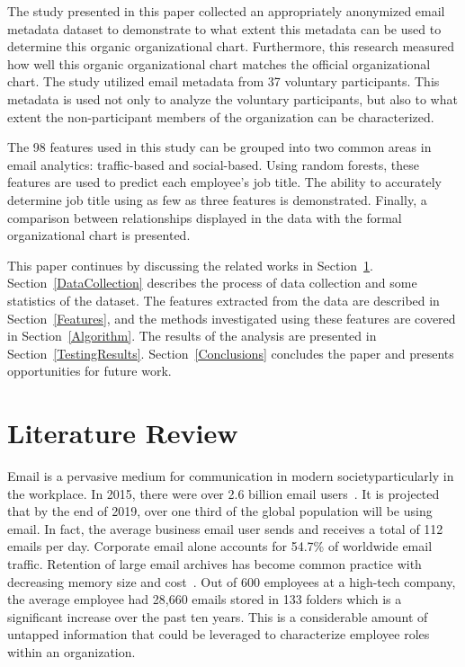 \documentclass[12pt]{report}
\begin{document}
The study presented in this paper collected an appropriately anonymized email metadata dataset to demonstrate to what extent this metadata can be used to determine this organic organizational chart.
Furthermore, this research measured how well this organic organizational chart matches the official organizational chart.
The study utilized email metadata from 37 voluntary participants.
This metadata is used not only to analyze the voluntary participants, but also to what extent the non-participant members of the organization can be characterized.

The 98 features used in this study can be grouped into two common areas in email analytics: traffic-based and social-based.
Using random forests, these features are used to predict each employee's job title.
The ability to accurately determine job title using as few as three features is demonstrated.
Finally, a comparison between relationships displayed in the data with the formal organizational chart is presented.  

This paper continues by discussing the related works in Section~\ref{LitReview}.  
Section~\ref{DataCollection} describes the process of data collection and some statistics of the dataset.
The features extracted from the data are described in Section~\ref{Features}, and the methods investigated using these features are covered in Section~\ref{Algorithm}.
The results of the analysis are presented in Section~\ref{TestingResults}.
Section~\ref{Conclusions} concludes the paper and presents opportunities for future work.  


\chapter{Literature Review} \label{LitReview}
Email is a pervasive medium for communication in modern society\textemdash{}particularly in the workplace.
In 2015, there were over 2.6 billion email users~\cite{radicati_emails_2015}.
It is projected that by the end of 2019, over one third of the global population will be using email.
In fact, the average business email user sends and receives a total of 112 emails per day.
Corporate email alone accounts for 54.7\% of worldwide email traffic.
Retention of large email archives has become common practice with decreasing memory size and cost~\cite{fisher_revisiting_2006}.
Out of 600 employees at a high-tech company, the average employee had 28,660 emails stored in 133 folders which is a significant increase over the past ten years.
This is a considerable amount of untapped information that could be leveraged to characterize employee roles within an organization.
\end{document}

